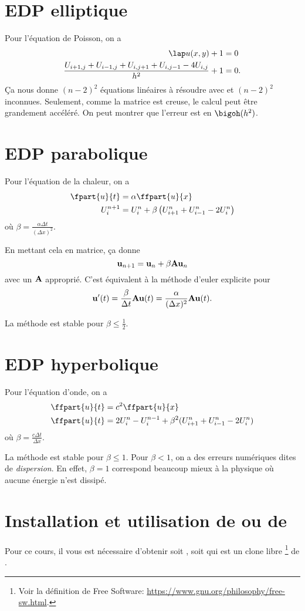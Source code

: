 \section{EDP elliptique}
Pour l'équation de Poisson, on a
\begin{align*}
  \lap u(x, y) + 1 & = 0\\
  \frac{U_{i+1,j} + U_{i-1,j} + U_{i,j+1} + U_{i,j-1} -4U_{i,j}}{h^2}
  + 1 & = 0.
\end{align*}
Ça nous donne $(n-2)^2$ équations linéaires à résoudre avec
et $(n-2)^2$ inconnues.
Seulement, comme la matrice est creuse, le calcul peut être grandement
accéléré.
On peut montrer que l'erreur est en $\bigoh(h^2)$.

\section{EDP parabolique}
Pour l'équation de la chaleur, on a
\begin{align*}
  \fpart{u}{t} & = \alpha \ffpart{u}{x}\\
  U_i^{n+1} & = U_i^n + \beta \left(U_{i+1}^n + U_{i-1}^n - 2U_i^n\right)
\end{align*}
où $\beta = \frac{\alpha\Delta t}{(\Delta x)^2}$.

En mettant cela en matrice, ça donne
\[ {\bf u}_{n+1} = {\bf u}_n + \beta {\bf A}{\bf u}_n \]
avec un ${\bf A}$ approprié.
C'est équivalent à la méthode d'euler explicite pour
\[ {\bf u}'(t) =
\frac{\beta}{\Delta t}{\bf A}{\bf u}(t) =
\frac{\alpha}{(\Delta x)^2}{\bf A}{\bf u}(t). \]

La méthode est stable pour $\beta \leq \frac{1}{2}$.

\section{EDP hyperbolique}
Pour l'équation d'onde, on a
\begin{align*}
  \ffpart{u}{t} & = c^2 \ffpart{u}{x}\\
  \ffpart{u}{t} & = 2U_i^n - U_i^{n-1} + \beta^2
  (U_{i+1}^n + U_{i-1}^n - 2U_i^n)
\end{align*}
où $\beta = \frac{c\Delta t}{\Delta x}$.

La méthode est stable pour $\beta \leq 1$.
Pour $\beta < 1$, on a des erreurs numériques dites de \emph{dispersion}.
En effet, $\beta = 1$ correspond beaucoup mieux à la physique où
aucune énergie n'est dissipé.

\annexe
\section{Installation et utilisation de \matlab{} ou de \octave{}}
Pour ce cours, il vous est nécessaire d'obtenir soit \matlab{},
soit \octave{} qui est un clone libre
\footnote{Voir la définition de Free Software:
  \url{https://www.gnu.org/philosophy/free-sw.html}.}
de \matlab{}.

